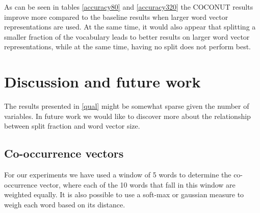 \documentclass[11pt]{article}
\begin{document}
As can be seen in tables \ref{accuracy80} and \ref{accuracy320} the COCONUT results improve more compared to the baseline results when larger word vector representations are used. At the same time, it would also appear that splitting a smaller fraction of the vocabulary leads to better results on larger word vector representations, while at the same time, having no split does not perform best.

\section{Discussion and future work}
The results presented in \ref{qual} might be somewhat sparse given the number of variables. In future work we would like to discover more about the relationship between split fraction and word vector size.
\subsection{Co-occurrence vectors}
For our experiments we have used a window of 5 words to determine the co-occurrence vector, where each of the 10 words that fall in this window are weighted equally. It is also possible to use a soft-max or gaussian measure to weigh each word based on its distance.
\end{document}
